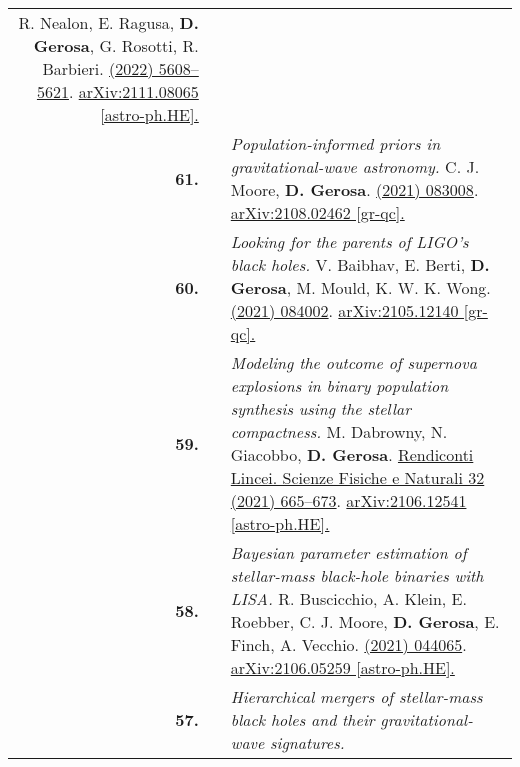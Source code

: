 {\begin{longtable}{rp{0.3cm}p{15.8cm}}
\newline{}
R. Nealon, E. Ragusa, \textbf{D. Gerosa}, G. Rosotti, R. Barbieri.
\newline{}
\href{https://doi.org/10.1093/mnras/stab3328}{\mnras 509 (2022) 5608–5621}. \href{https://arxiv.org/abs/2111.08065}{arXiv:2111.08065 [astro-ph.HE].}
\vspace{0.09cm}\\
%
\textbf{61.} & & \textit{Population-informed priors in gravitational-wave astronomy.}
\newline{}
C. J. Moore, \textbf{D. Gerosa}.
\newline{}
\href{https://journals.aps.org/prd/abstract/10.1103/PhysRevD.104.083008}{\prd 104 (2021) 083008}. \href{https://arxiv.org/abs/2108.02462}{arXiv:2108.02462 [gr-qc].}
\vspace{0.09cm}\\
%
\textbf{60.} & & \textit{Looking for the parents of LIGO's black holes.}
\newline{}
V. Baibhav, E. Berti, \textbf{D. Gerosa}, M. Mould, K. W. K. Wong.
\newline{}
\href{https://journals.aps.org/prd/abstract/10.1103/PhysRevD.104.084002}{\prd 104 (2021) 084002}. \href{https://arxiv.org/abs/2105.12140}{arXiv:2105.12140 [gr-qc].}
\vspace{0.09cm}\\
%
\textbf{59.} & & \textit{Modeling the outcome of supernova explosions in binary population synthesis using the stellar compactness.}
\newline{}
M. Dabrowny, N. Giacobbo, \textbf{D. Gerosa}.
\newline{}
\href{https://link.springer.com/article/10.1007/s12210-021-01019-8}{Rendiconti Lincei. Scienze Fisiche e Naturali 32 (2021) 665–673}. \href{https://arxiv.org/abs/2106.12541}{arXiv:2106.12541 [astro-ph.HE].}
\vspace{0.09cm}\\
%
\textbf{58.} & & \textit{Bayesian parameter estimation of stellar-mass black-hole binaries with LISA.}
\newline{}
R. Buscicchio, A. Klein, E. Roebber, C. J. Moore, \textbf{D. Gerosa}, E. Finch, A. Vecchio.
\newline{}
\href{https://journals.aps.org/prd/abstract/10.1103/PhysRevD.104.044065}{\prd 104 (2021) 044065}. \href{https://arxiv.org/abs/2106.05259}{arXiv:2106.05259 [astro-ph.HE].}
\vspace{0.09cm}\\
%
\textbf{57.} & & \textit{Hierarchical mergers of stellar-mass black holes and their gravitational-wave signatures.}

\end{longtable}}
